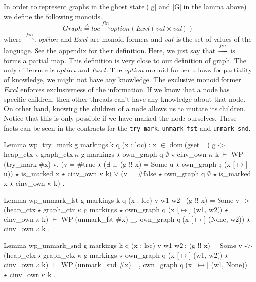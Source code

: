 \documentclass[]{scrartcl}
\def\MyMLe{\lstinline[language=MyML, basicstyle=\small\ttfamily, mathescape=true]}
\newcommand{\defeq}{\overset{\Delta}{=}}
\newcommand{\val}{\mathit{val}}
\newcommand{\loc}{\mathit{loc}}
\newcommand{\option}{\mathit{option}}
\newcommand{\Excl}{\mathit{Excl}}
\newcommand{\finmap}{\overset{\mathit{fin}}{\rightharpoonup}}
\begin{document}
In order to represent graphs in the ghost state (\Coqe|g| and \Coqe|G| in the lamma above) we define the following monoids.
\[
\mathit{Graph} \defeq \loc \finmap \option(\Excl(\val \times \val))
\]
where $\finmap$, $\option$ and $\Excl$ are monoid formers and $\val$ is the set of values of the language.
See the appendix for their definition.
Here, we just say that $\finmap$ is forms a partial map.
This definition is very close to our definition of graph.
The only difference is $\option$ and $\Excl$.
The $\option$ monoid former allows for partiality of knowledge,
we might not have any knowledge.
The exclusive monoid former $\Excl$ enforces exclusiveness of the
information.
If we know that a node has specific children, then other threads
can't have any knowledge about that node.
On other hand, knowing the children of a node allows us to mutate its
children. Notice that this is only possible if we have marked the node
ourselves.
These facts can be seen in the contracts for the \MyMLe{try_mark},
\MyMLe{unmark_fst} and \MyMLe{unmark_snd}.
\begin{Coq}
Lemma wp_try_mark g markings k q (x : loc) : x $\in$ dom (gset _) g ->
    heap_ctx $\star$ graph_ctx $\kappa$ g markings $\star$ own_graph q $\emptyset$
     $\star$ cinv_own $\kappa$ k
    $\vdash$ WP (try_mark $\#$x) {{ v,
         (v = $\#$true $\star$ ($\exists$ u, (g !! x) = Some u $\star$ own_graph q (x [$\mapsto$] u))
          $\star$ is_marked x $\star$ cinv_own $\kappa$ k)
           $\lor$ (v = $\#$false $\star$ own_graph q $\emptyset$ $\star$ is_marked x
              $\star$ cinv_own $\kappa$ k) }}.
\end{Coq}

\begin{Coq}
Lemma wp_unmark_fst g markings k q (x : loc) v w1 w2 :
    (g !! x) = Some v ->
    (heap_ctx $\star$ graph_ctx $\kappa$ g markings
     $\star$ own_graph q (x [$\mapsto$] (w1, w2)) $\star$ cinv_own $\kappa$ k) $\vdash$
      WP (unmark_fst $\#$x)
      {{ _, own_graph q (x [$\mapsto$] (None, w2)) $\star$ cinv_own $\kappa$ k }}.
\end{Coq}

\begin{Coq}
Lemma wp_unmark_snd g markings k q (x : loc) v w1 w2 :
    (g !! x) = Some v ->
    (heap_ctx $\star$ graph_ctx $\kappa$ g markings
    $\star$ own_graph q (x [$\mapsto$] (w1, w2)) $\star$ cinv_own $\kappa$ k) $\vdash$
      WP (unmark_snd $\#$x)
      {{ _, own_graph q (x [$\mapsto$] (w1, None)) $\star$ cinv_own $\kappa$ k }}.
\end{Coq}
\end{document}
